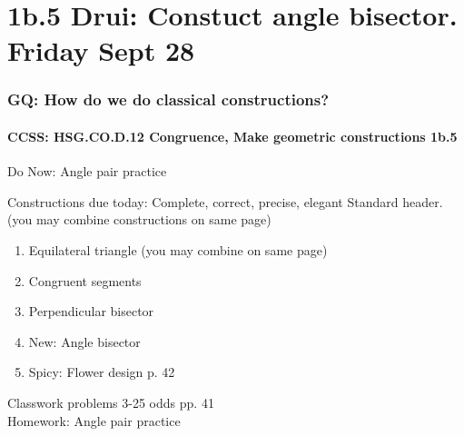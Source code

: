 \documentclass{beamer}
\begin{document}
\section{1b.5 Drui: Constuct angle bisector. Friday Sept 28}
  \frame
  {
    \frametitle{GQ: How do we do classical constructions?}
    \framesubtitle{CCSS: HSG.CO.D.12 Congruence, Make geometric constructions  \alert{1b.5}}
    Do Now: Angle pair practice
    \begin{block}{Constructions due today: Complete, correct, precise, elegant}
      Standard header. (you may combine constructions on same page)
      \begin{enumerate}
          \item Equilateral triangle (you may combine on same page)
          \item Congruent segments
          \item Perpendicular bisector
          \item New: Angle bisector
          \item Spicy: Flower design p. 42
      \end{enumerate}
    \end{block}
    Classwork problems 3-25 odds pp. 41\\
    \vspace{0.5cm}
    Homework: Angle pair practice
  }
\end{document}
